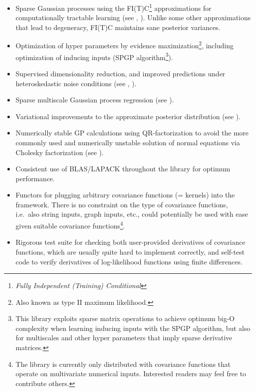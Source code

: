 \documentclass[10pt]{report}
\begin{document}
\begin{itemize}

\item Sparse Gaussian processes using the FI(T)C\footnote{\emph{Fully
Independent (Training) Conditional}} approximations for computationally
tractable learning (see \cite{conf/nips/2005}, \cite{SnelsonThesis}).
Unlike some other approximations that lead to degeneracy, FI(T)C
maintains sane posterior variances.

\item Optimization of hyper parameters by evidence
maximization\footnote{Also known as type II maximum likelihood.},
including optimization of inducing inputs (SPGP algorithm\footnote{This
library exploits sparse matrix operations to achieve optimum big-O
complexity when learning inducing inputs with the SPGP algorithm,
but also for multiscales and other hyper parameters that imply
sparse derivative matrices.}).

\item Supervised dimensionality reduction, and improved predictions
under heteroskedastic noise conditions (see \cite{conf/uai/SnelsonG06},
\cite{SnelsonThesis}).

\item Sparse multiscale Gaussian process regression (see
\cite{conf/icml/WalderKS08}).

\item Variational improvements to the approximate posterior
distribution (see \cite{Titsias2009}).

\item Numerically stable GP calculations using QR-factorization to
avoid the more commonly used and numerically unstable solution of
normal equations via Cholesky factorization (see \cite{Foster2009}).

\item Consistent use of BLAS/LAPACK throughout the library for
optimum performance.

\item Functors for plugging arbitrary covariance functions (=
kernels) into the framework.  There is no constraint on the type
of covariance functions, i.e.\ also string inputs, graph inputs,
etc., could potentially be used with ease given suitable covariance
functions\footnote{The library is currently only distributed with
covariance functions that operate on multivariate numerical inputs.
Interested readers may feel free to contribute others.}.

\item Rigorous test suite for checking both user-provided derivatives
of covariance functions, which are usually quite hard to implement
correctly, and self-test code to verify derivatives of log-likelihood
functions using finite differences.

\end{itemize}
\end{document}
